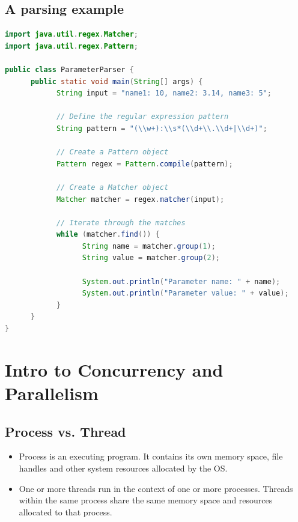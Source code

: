 \documentclass[letterpaper,12pt]{article}
\begin{document}
\subsection{A parsing example}
\begin{lstlisting}[language=Java]
import java.util.regex.Matcher;
import java.util.regex.Pattern;

public class ParameterParser {
      public static void main(String[] args) {
            String input = "name1: 10, name2: 3.14, name3: 5";

            // Define the regular expression pattern
            String pattern = "(\\w+):\\s*(\\d+\\.\\d+|\\d+)";

            // Create a Pattern object
            Pattern regex = Pattern.compile(pattern);

            // Create a Matcher object
            Matcher matcher = regex.matcher(input);

            // Iterate through the matches
            while (matcher.find()) {
                  String name = matcher.group(1);
                  String value = matcher.group(2);

                  System.out.println("Parameter name: " + name);
                  System.out.println("Parameter value: " + value);
            }
      }
}      
\end{lstlisting}


\section{Intro to Concurrency and Parallelism}
\subsection{Process vs. Thread}
\begin{itemize}
      \item Process is an executing program. It contains its own memory space, file handles and other system resources allocated by the OS.
      \item One or more threads run in the context of one or more processes. Threads within the same process share the same memory space and resources allocated to that process. 
\end{itemize}
\end{document}
